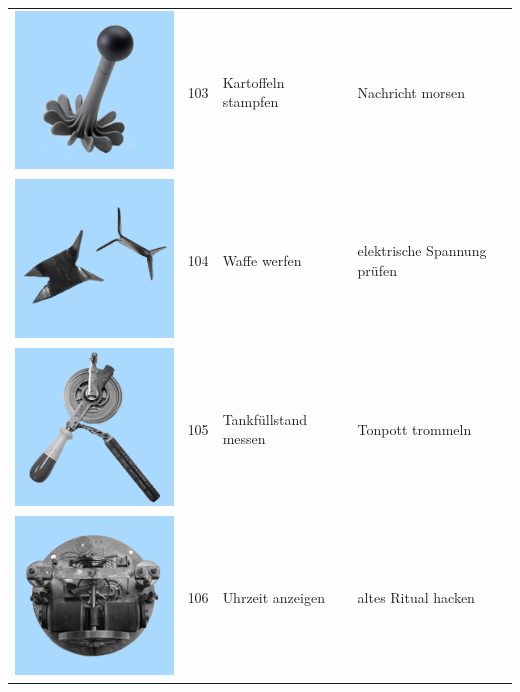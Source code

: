 \documentclass[
  english,
  doc,12pt,twoside,floatsintext]{apa7}
\begin{document}
\begin{center}
\begin{ThreePartTable}
\begin{longtable}{llll}
\includegraphics[valign=c, scale=0.19]{../materials/unfamiliar/103.png} & 103 & Kartoffeln stampfen & Nachricht morsen\\
\includegraphics[valign=c, scale=0.19]{../materials/unfamiliar/104.png} & 104 & Waffe werfen & elektrische Spannung prüfen\\
\includegraphics[valign=c, scale=0.19]{../materials/unfamiliar/105.png} & 105 & Tankfüllstand messen & Tonpott trommeln\\
\includegraphics[valign=c, scale=0.19]{../materials/unfamiliar/106.png} & 106 & Uhrzeit anzeigen & altes Ritual hacken\\

\end{longtable}
\end{ThreePartTable}
\end{center}
\end{document}
